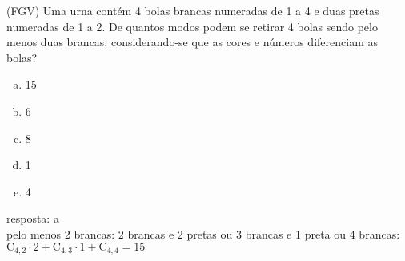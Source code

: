 \begin{ex}
 	(FGV) Uma urna contém 4 bolas brancas numeradas de 1 a 4 e duas pretas numeradas de 1 a 2. De quantos modos podem se retirar 4 bolas sendo  pelo menos duas brancas, considerando-se que as cores e números diferenciam as bolas?
    \begin{enumerate}[(a)]
    \item 15
    \item 6
    \item 8
    \item 1
    \item 4
    \end{enumerate}
      \begin{sol}
       resposta: a \\
       pelo menos 2 brancas:  2 brancas e 2 pretas ou 3 brancas e 1 preta ou 4 brancas: \\
       $\mathrm{C}_{4,2}\cdot2+\mathrm{C}_{4,3}\cdot1+\mathrm{C}_{4,4}=15$
      \end{sol}
\end{ex}